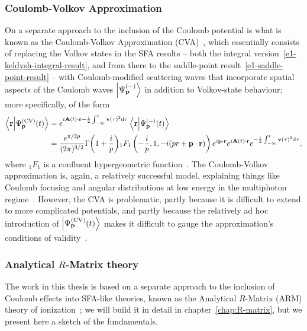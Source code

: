 \subsubsection{Coulomb-Volkov Approximation}
On a separate approach to the inclusion of the Coulomb potential is what is known as the Coulomb-Volkov Approximation (CVA)~\cite{jain_coulomb-volkov_1978,cavaliere_coulomb-volkov_1980}, which essentially consists of replacing the Volkov states in the SFA results -- both the integral version~\eqref{e1-keldysh-integral-result}, and from there to the saddle-point result~\eqref{e1-saddle-point-result} -- with Coulomb-modified scattering waves that incorporate spatial aspects of the Coulomb waves $\ket{\Psi_{\vb{p}}^{(-)}}$ in addition to Volkov-state behaviour; more specifically, of the form
\begin{align}
\braket{\vb{r}}{\Psi_{\vb{p}}^\mathrm{(CV)}(t)}
& =
e^{i\vb{A}(t)\cdot\vb{r} - \frac i2\int_{-\infty}^t \vb{v}(\tau)^2\mathrm{d}\tau}
\braket{\vb{r}}{\Psi_{\vb{p}}^{(-)}(t)}
 \\ & = 
\frac{e^{\pi/2p}}{(2\pi)^{3/2}}
\Gamma\mathopen{}\left(1+\frac{i}{p}\right)\mathclose{}
{}_1F_1\left( -\frac{i}{p},1,-i(pr+\vb{p}\cdot\vb{r})\right)
e^{i\vb{p}\cdot\vb{r}}
e^{i\vb{A}(t)\cdot\vb{r}}
e^{-\frac i2\int_{-\infty}^t \vb{v}(\tau)^2\mathrm{d}\tau}
\nonumber
,
\end{align}
where ${}_1F_1$ is a confluent hypergeometric function~. The Coulomb-Volkov approximation is, again, a relatively successful model, explaining things like Coulomb focusing and angular distributions at low energy in the multiphoton regime~\cite{arbo_coulomb-volkov_2008}. However, the CVA is problematic, partly because it is difficult to extend to more complicated potentials, and partly because the relatively ad hoc introduction of $\ket{\Psi_{\vb{p}}^\mathrm{(CV)}(t)}$ makes it difficult to gauge the approximation's conditions of validity~\cite{ popruzhenko_Keldysh_theory}.







\subsubsection[Analytical R-Matrix theory]{Analytical $R$-Matrix theory}
The work in this thesis is based on a separate approach to the inclusion of Coulomb effects into SFA-like theories, known as the Analytical $R$-Matrix (ARM) theory of ionization~\cite{torlina_thesis, kaushal_thesis, ARM_initial, ARM_initial_multielectron}; we will build it in detail in chapter~\ref{chap:R-matrix}, but we present here a sketch of the fundamentals. 

